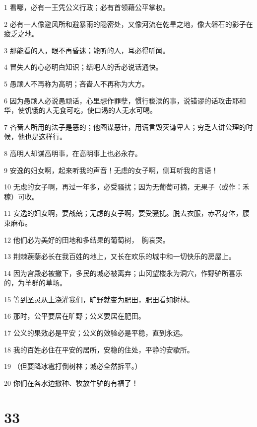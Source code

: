 \par 1 看哪，必有一王凭公义行政；必有首领藉公平掌权。
\par 2 必有一人像避风所和避暴雨的隐密处，又像河流在乾旱之地，像大磐石的影子在疲乏之地。
\par 3 那能看的人，眼不再昏迷；能听的人，耳必得听闻。
\par 4 冒失人的心必明白知识；结吧人的舌必说话通快。
\par 5 愚顽人不再称为高明；吝啬人不再称为大方。
\par 6 因为愚顽人必说愚顽话，心里想作罪孽，惯行亵渎的事，说错谬的话攻击耶和华，使饥饿的人无食可吃，使口渴的人无水可喝。
\par 7 吝啬人所用的法子是恶的；他图谋恶计，用谎言毁灭谦卑人；穷乏人讲公理的时候，他也是这样行。
\par 8 高明人却谋高明事，在高明事上也必永存。
\par 9 安逸的妇女啊，起来听我的声音！无虑的女子啊，侧耳听我的言语！
\par 10 无虑的女子啊，再过一年多，必受骚扰；因为无葡萄可摘，无果子（或作：禾稼）可收。
\par 11 安逸的妇女啊，要战兢；无虑的女子啊，要受骚扰。脱去衣服，赤著身体，腰束麻布。
\par 12 他们必为美好的田地和多结果的葡萄树，　胸哀哭。
\par 13 荆棘蒺藜必长在我百姓的地上，又长在欢乐的城中和一切快乐的房屋上。
\par 14 因为宫殿必被撇下，多民的城必被离弃；山冈望楼永为洞穴，作野驴所喜乐的，为羊群的草场。
\par 15 等到圣灵从上浇灌我们，旷野就变为肥田，肥田看如树林。
\par 16 那时，公平要居在旷野；公义要居在肥田。
\par 17 公义的果效必是平安；公义的效验必是平稳，直到永远。
\par 18 我的百姓必住在平安的居所，安稳的住处，平静的安歇所。
\par 19 （但要降冰雹打倒树林；城必全然拆平。）
\par 20 你们在各水边撒种、牧放牛驴的有福了！

\chapter{33}

